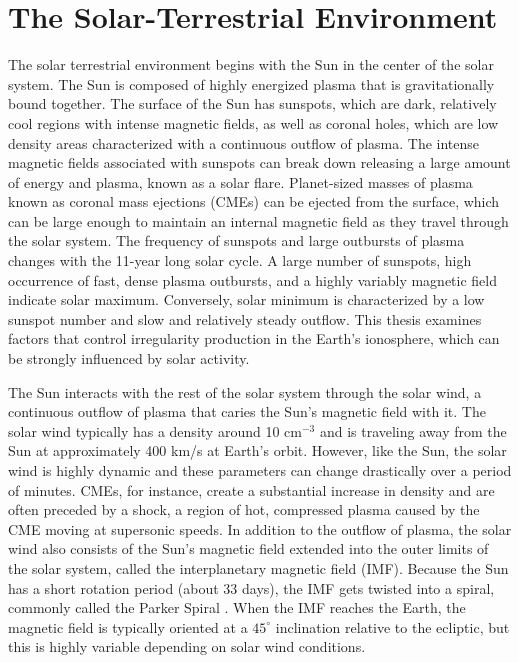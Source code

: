 \label{sec:introduction}

\section{The Solar-Terrestrial Environment}
The solar terrestrial environment begins with the Sun in the center of the solar system.  The Sun is composed of highly energized plasma that is gravitationally bound together.  The surface of the Sun has sunspots, which are dark, relatively cool regions with intense magnetic fields, as well as coronal holes, which are low density areas characterized with a continuous outflow of plasma.  The intense magnetic fields associated with sunspots can break down releasing a large amount of energy and plasma, known as a solar flare.  Planet-sized masses of plasma known as coronal mass ejections (CMEs) can be ejected from the surface, which can be large enough to maintain an internal magnetic field as they travel through the solar system.  The frequency of sunspots and large outbursts of plasma changes with the 11-year long solar cycle.  A large number of sunspots, high occurrence of fast, dense plasma outbursts, and a highly variably magnetic field indicate solar maximum.  Conversely, solar minimum is characterized by a low sunspot number and slow and relatively steady outflow.  This thesis examines factors that control irregularity production in the Earth's ionosphere, which can be strongly influenced by solar activity.

The Sun interacts with the rest of the solar system through the solar wind, a continuous outflow of plasma that caries the Sun's magnetic field with it.  The solar wind typically has a density around 10 cm\(^{-3}\) and is traveling away from the Sun at approximately 400 km/s at Earth's orbit.  However, like the Sun, the solar wind is highly dynamic and these parameters can change drastically over a period of minutes.  CMEs, for instance, create a substantial increase in density and are often preceded by a shock, a region of hot, compressed plasma caused by the CME moving at supersonic speeds.  In addition to the outflow of plasma, the solar wind also consists of the Sun's magnetic field extended into the outer limits of the solar system, called the interplanetary magnetic field (IMF).  Because the Sun has a short rotation period (about 33 days), the IMF gets twisted into a spiral, commonly called the Parker Spiral \citep{Parker1958}.  When the IMF reaches the Earth, the magnetic field is typically oriented at a \(45^\circ\) inclination relative to the ecliptic, but this is highly variable depending on solar wind conditions.

